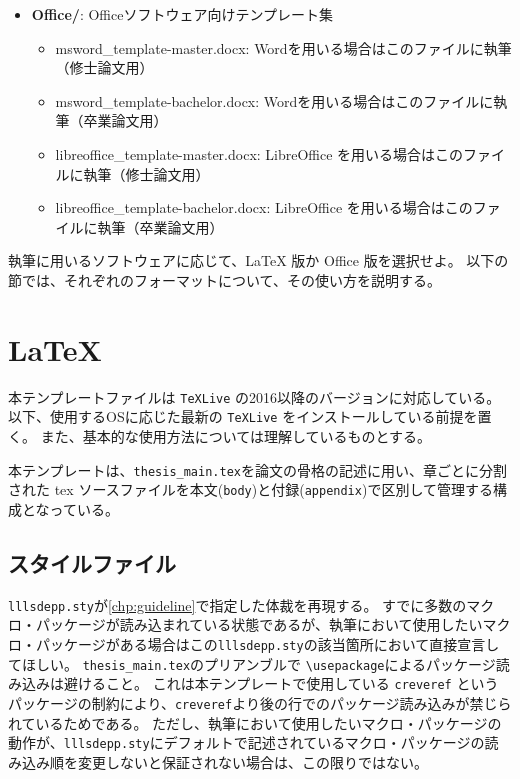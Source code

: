 \begin{itemize}
\begin{itemize}
			\end{itemize}
			\item \textbf{Office/}: Officeソフトウェア向けテンプレート集
				\begin{itemize}
					\item msword\_template-master.docx: Word\textsuperscript{\textregistered}を用いる場合はこのファイルに執筆（修士論文用）
					\item msword\_template-bachelor.docx: Word\textsuperscript{\textregistered}を用いる場合はこのファイルに執筆（卒業論文用）
					\item libreoffice\_template-master.docx: LibreOffice を用いる場合はこのファイルに執筆（修士論文用）
					\item libreoffice\_template-bachelor.docx: LibreOffice を用いる場合はこのファイルに執筆（卒業論文用）
				\end{itemize}
		\end{itemize}

		\noindent
		執筆に用いるソフトウェアに応じて、\LaTeX{} 版か Office 版を選択せよ。
		以下の節では、それぞれのフォーマットについて、その使い方を説明する。

	\section{LaTeX}
		\label{sec:latex}

		本テンプレートファイルは \texttt{TeXLive} の2016以降のバージョンに対応している。
		以下、使用するOSに応じた最新の \texttt{TeXLive} をインストールしている前提を置く。
		また、基本的な使用方法については理解しているものとする。

		本テンプレートは、\texttt{thesis\_main.tex}を論文の骨格の記述に用い、章ごとに分割された tex ソースファイルを本文(\texttt{body})と付録(\texttt{appendix})で区別して管理する構成となっている。

		\subsection{スタイルファイル}
			\label{sub:style_file}

			\texttt{lllsdepp.sty}が\cref{chp:guideline}で指定した体裁を再現する。
			すでに多数のマクロ・パッケージが読み込まれている状態であるが、執筆において使用したいマクロ・パッケージがある場合はこの\texttt{lllsdepp.sty}の該当箇所において直接宣言してほしい。
			\texttt{thesis\_main.tex}のプリアンブルで \texttt{\textbackslash usepackage}によるパッケージ読み込みは避けること。
			これは本テンプレートで使用している \texttt{creveref} というパッケージの制約により、\texttt{creveref}より後の行でのパッケージ読み込みが禁じられているためである。
			ただし、執筆において使用したいマクロ・パッケージの動作が、\texttt{lllsdepp.sty}にデフォルトで記述されているマクロ・パッケージの読み込み順を変更しないと保証されない場合は、この限りではない。


